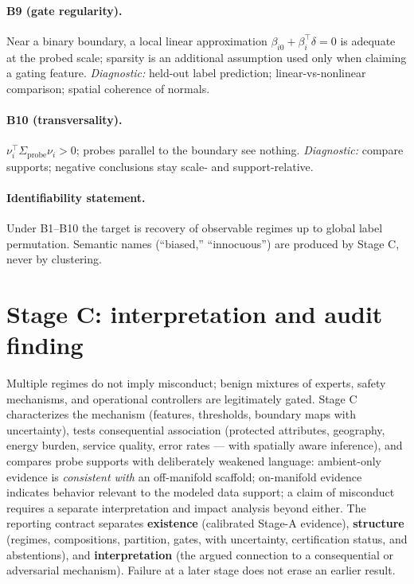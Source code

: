\documentclass[11pt]{article}
\begin{document}
\paragraph{B9 (gate regularity).} Near a binary boundary, a local linear approximation
\(\beta_{i0}+\beta_i^\top\delta=0\) is adequate at the probed scale; sparsity is an
additional assumption used only when claiming a gating feature. \emph{Diagnostic:} held-out
label prediction; linear-vs-nonlinear comparison; spatial coherence of normals.

\paragraph{B10 (transversality).} \(\nu_i^\top\Sigma_{\mathrm{probe}}\nu_i>0\); probes
parallel to the boundary see nothing. \emph{Diagnostic:} compare supports; negative
conclusions stay scale- and support-relative.

\paragraph{Identifiability statement.} Under B1--B10 the target is recovery of observable
regimes up to global label permutation. Semantic names (``biased,'' ``innocuous'') are
produced by Stage C, never by clustering.

\section{Stage C: interpretation and audit finding}
\label{sec:stagec}

Multiple regimes do not imply misconduct; benign mixtures of experts, safety mechanisms, and
operational controllers are legitimately gated. Stage C characterizes the mechanism
(features, thresholds, boundary maps with uncertainty), tests consequential association
(protected attributes, geography, energy burden, service quality, error rates --- with
spatially aware inference), and compares probe supports with deliberately weakened language:
ambient-only evidence is \emph{consistent with} an off-manifold scaffold; on-manifold
evidence indicates behavior relevant to the modeled data support; a claim of misconduct
requires a separate interpretation and impact analysis beyond either. The reporting contract
separates \textbf{existence} (calibrated Stage-A evidence), \textbf{structure} (regimes,
compositions, partition, gates, with uncertainty, certification status, and abstentions), and
\textbf{interpretation} (the argued connection to a consequential or adversarial mechanism).
Failure at a later stage does not erase an earlier result.
\end{document}
